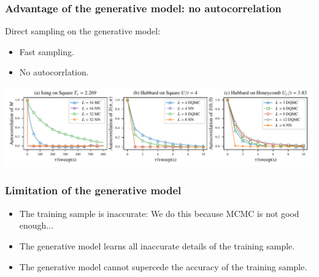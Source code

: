 \documentclass[xcolor=table, 10pt, aspectratio=169, ignorenonframetext]{beamer}
\begin{document}
\begin{frame}
  \frametitle{Advantage of the generative model: no autocorrelation}
  Direct sampling on the generative model:
  \begin{itemize}
  \item Fast sampling.
  \item No autocorrlation.
  \end{itemize}
  \begin{center}
    \includegraphics{autocorr-a}
  \end{center}
\end{frame}

\begin{frame}
  \frametitle{Limitation of the generative model}
  \begin{itemize}
  \item The training sample is inaccurate: We do this because MCMC is not good enough...
  \item The generative model learns all inaccurate details of the training sample.
  \item The generative model cannot supercede the accuracy of the training sample.
  \end{itemize}
  \begin{center}
  \end{center}
\end{frame}
\end{document}
